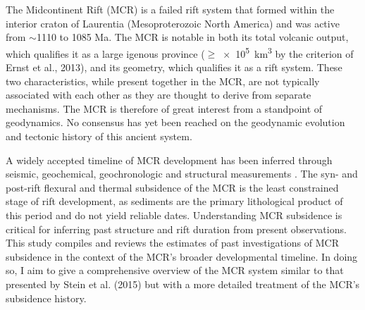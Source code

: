 \documentclass[12pt,letterpaper]{article}
\renewenvironment{abstract}
 {\small
  \begin{center}
  \bfseries \abstractname\vspace{-.5em}\vspace{0pt}
  \end{center}
  \list{}{
    \setlength{\leftmargin}{.5cm}%
    \setlength{\rightmargin}{\leftmargin}%
  }%
  \item\relax}
 {\endlist}
\begin{document}
\begin{abstract}
\hline
The Midcontinent Rift (MCR) is a failed rift system that formed within the interior craton of Laurentia (Mesoproterozoic North America) and was active from $\sim$1110 to 1085 Ma. The MCR is notable in both its total volcanic output, which qualifies it as a large igenous province ($\geq$\SI{e5}{km^3} by the criterion of Ernst et al., 2013\nocite{Ernst2013b}), and its geometry, which qualifies it as a rift system. These two characteristics, while present together in the MCR, are not typically associated with each other as they are thought to derive from separate mechanisms. The MCR is therefore of great interest from a standpoint of geodynamics. No consensus has yet been reached on the geodynamic evolution and tectonic history of this ancient system.\par
A widely accepted timeline of MCR development has been inferred through seismic, geochemical, geochronologic and structural measurements \citep{Cannon1989a,Cannon1992b,White1997a,Stein2015a}. The syn- and post-rift flexural and thermal subsidence of the MCR is the least constrained stage of rift development, as sediments are the primary lithological product of this period and do not yield reliable dates. Understanding MCR subsidence is critical for inferring past structure and rift duration from present observations. This study compiles and reviews the estimates of past investigations of MCR subsidence in the context of the MCR's broader developmental timeline. In doing so, I aim to give a comprehensive overview of the MCR system similar to that presented by Stein et al. (2015) but with a more detailed treatment of the MCR's subsidence history.
\vspace{0.5em}\hline
\end{abstract}
\end{document}
